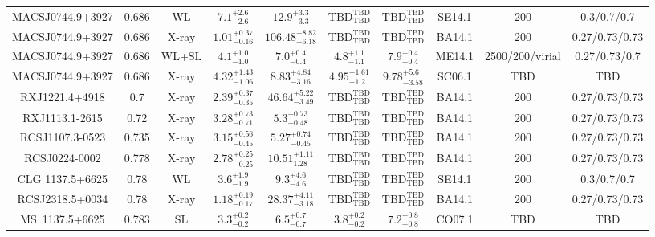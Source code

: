\begin{table}
\begin{tabular}{cccccccccc}
MACSJ0744.9+3927 & 0.686 & WL & ${7.1}^{+2.6}_{-2.6}$ & ${12.9}^{+3.3}_{-3.3}$ & ${\mathrm{TBD}}^{\mathrm{TBD}}_{\mathrm{TBD}}$ & ${\mathrm{TBD}}^{\mathrm{TBD}}_{\mathrm{TBD}}$ & SE14.1 & 200 & 0.3/0.7/0.7 \\
MACSJ0744.9+3927 & 0.686 & X-ray & ${1.01}^{+0.37}_{-0.16}$ & ${106.48}^{+8.82}_{-6.18}$ & ${\mathrm{TBD}}^{\mathrm{TBD}}_{\mathrm{TBD}}$ & ${\mathrm{TBD}}^{\mathrm{TBD}}_{\mathrm{TBD}}$ & BA14.1 & 200 & 0.27/0.73/0.73 \\
MACSJ0744.9+3927 & 0.686 & WL+SL & ${4.1}^{+1.0}_{-1.0}$ & ${7.0}^{+0.4}_{-0.4}$ & ${4.8}^{+1.1}_{-1.1}$ & ${7.9}^{+0.4}_{-0.4}$ & ME14.1 & 2500/200/virial & 0.27/0.73/0.7 \\
MACSJ0744.9+3927 & 0.686 & X-ray & ${4.32}^{+1.43}_{-1.06}$ & ${8.83}^{+4.84}_{-3.16}$ & ${4.95}^{+1.61}_{-1.2}$ & ${9.78}^{+5.6}_{-3.58}$ & SC06.1 & TBD & TBD \\
RXJ1221.4+4918 & 0.7 & X-ray & ${2.39}^{+0.37}_{-0.35}$ & ${46.64}^{+5.22}_{-3.49}$ & ${\mathrm{TBD}}^{\mathrm{TBD}}_{\mathrm{TBD}}$ & ${\mathrm{TBD}}^{\mathrm{TBD}}_{\mathrm{TBD}}$ & BA14.1 & 200 & 0.27/0.73/0.73 \\
RXJ1113.1-2615 & 0.72 & X-ray & ${3.28}^{+0.73}_{-0.71}$ & ${5.3}^{+0.73}_{-0.48}$ & ${\mathrm{TBD}}^{\mathrm{TBD}}_{\mathrm{TBD}}$ & ${\mathrm{TBD}}^{\mathrm{TBD}}_{\mathrm{TBD}}$ & BA14.1 & 200 & 0.27/0.73/0.73 \\
RCSJ1107.3-0523 & 0.735 & X-ray & ${3.15}^{+0.56}_{-0.45}$ & ${5.27}^{+0.74}_{-0.45}$ & ${\mathrm{TBD}}^{\mathrm{TBD}}_{\mathrm{TBD}}$ & ${\mathrm{TBD}}^{\mathrm{TBD}}_{\mathrm{TBD}}$ & BA14.1 & 200 & 0.27/0.73/0.73 \\
RCSJ0224-0002 & 0.778 & X-ray & ${2.78}^{+0.25}_{-0.25}$ & ${10.51}^{+1.11}_{1.28}$ & ${\mathrm{TBD}}^{\mathrm{TBD}}_{\mathrm{TBD}}$ & ${\mathrm{TBD}}^{\mathrm{TBD}}_{\mathrm{TBD}}$ & BA14.1 & 200 & 0.27/0.73/0.73 \\
CLG 1137.5+6625 & 0.78 & WL & ${3.6}^{+1.9}_{-1.9}$ & ${9.3}^{+4.6}_{-4.6}$ & ${\mathrm{TBD}}^{\mathrm{TBD}}_{\mathrm{TBD}}$ & ${\mathrm{TBD}}^{\mathrm{TBD}}_{\mathrm{TBD}}$ & SE14.1 & 200 & 0.3/0.7/0.7 \\
RCSJ2318.5+0034 & 0.78 & X-ray & ${1.18}^{+0.19}_{-0.17}$ & ${28.37}^{+4.11}_{-3.18}$ & ${\mathrm{TBD}}^{\mathrm{TBD}}_{\mathrm{TBD}}$ & ${\mathrm{TBD}}^{\mathrm{TBD}}_{\mathrm{TBD}}$ & BA14.1 & 200 & 0.27/0.73/0.73 \\
MS~1137.5+6625 & 0.783 & SL & ${3.3}^{+0.2}_{-0.2}$ & ${6.5}^{+0.7}_{-0.7}$ & ${3.8}^{+0.2}_{-0.2}$ & ${7.2}^{+0.8}_{-0.8}$ & CO07.1 & TBD & TBD \\

\end{tabular}
\end{table}

